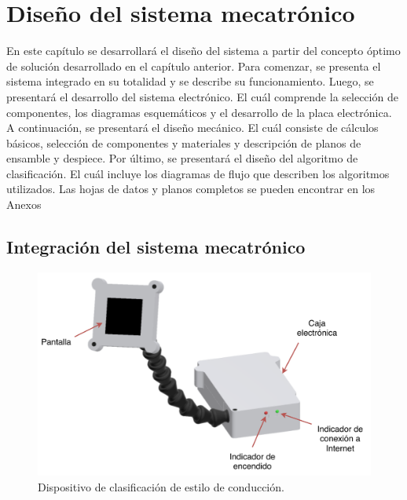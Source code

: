  \chapter{Diseño del sistema mecatrónico }

 En este capítulo se desarrollará el diseño del sistema a partir del concepto óptimo de solución desarrollado en el capítulo anterior. Para comenzar, se presenta el sistema integrado en su totalidad y se describe su funcionamiento. Luego, se presentará el desarrollo del sistema electrónico. El cuál comprende la selección de componentes, los diagramas esquemáticos y el desarrollo de la placa electrónica. A continuación, se presentará el diseño mecánico. El cuál consiste de cálculos básicos, selección de componentes y materiales y descripción de planos de ensamble y despiece. Por último, se presentará el diseño del algoritmo de clasificación. El cuál incluye los diagramas de flujo que describen los algoritmos utilizados. Las hojas de datos y planos completos se pueden encontrar en los Anexos

 \graphicspath{{Chapter4/Figuras/}{Chapter4/Figs/PDF/}{Chapter4/Figs/}{Chapter4/segundo/}}

\section{Integración del sistema mecatrónico}

\begin{figure}[htbp!]
\centering
\includegraphics[width=\textwidth]{modelo_1.pdf}
\caption{Dispositivo de clasificación de estilo de conducción.}
\label{fig:modelo1}
\end{figure}

